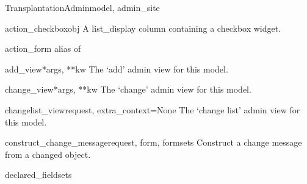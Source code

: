 \documentclass[letterpaper,10pt,english]{sphinxmanual}
\begin{document}
\hypertarget{data.admin.TransplantationAdmin}{}\begin{classdesc}{TransplantationAdmin}{model, admin\_site}~

\hypertarget{data.admin.TransplantationAdmin.action_checkbox}{}\begin{methoddesc}{action\_checkbox}{obj}
A list\_display column containing a checkbox widget.
\end{methoddesc}

\hypertarget{data.admin.TransplantationAdmin.action_form}{}\begin{memberdesc}{action\_form}
alias of 
\end{memberdesc}

\hypertarget{data.admin.TransplantationAdmin.add_view}{}\begin{methoddesc}{add\_view}{*args, **kw}
The `add' admin view for this model.
\end{methoddesc}

\hypertarget{data.admin.TransplantationAdmin.change_view}{}\begin{methoddesc}{change\_view}{*args, **kw}
The `change' admin view for this model.
\end{methoddesc}

\hypertarget{data.admin.TransplantationAdmin.changelist_view}{}\begin{methoddesc}{changelist\_view}{request, extra\_context=None}
The `change list' admin view for this model.
\end{methoddesc}

\hypertarget{data.admin.TransplantationAdmin.construct_change_message}{}\begin{methoddesc}{construct\_change\_message}{request, form, formsets}
Construct a change message from a changed object.
\end{methoddesc}

\hypertarget{data.admin.TransplantationAdmin.declared_fieldsets}{}\begin{memberdesc}{declared\_fieldsets}\end{memberdesc}


\end{classdesc}
\end{document}
